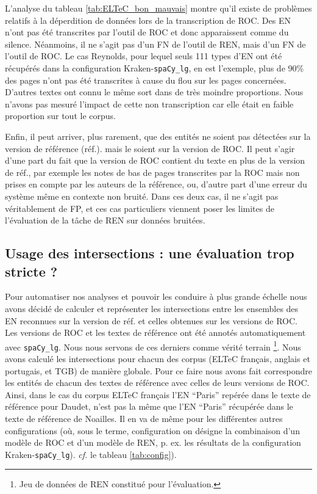 L'analyse du tableau \ref{tab:ELTeC_bon_mauvais} montre qu'il existe de problèmes relatifs à la déperdition de données lors de la transcription de ROC. Des EN n'ont pas été transcrites par l'outil de ROC et donc apparaissent comme du silence. Néanmoins, il ne s'agit pas d'un FN de l'outil de REN, mais d'un FN de l'outil de ROC. Le cas Reynolds, pour lequel seuls 111 types d'EN ont été récupérés dans la configuration Kraken-\texttt{spaCy\_lg}, en est l'exemple, plus de 90\% des pages n'ont pas été transcrites à cause du flou sur les pages concernées. D'autres textes ont connu le même sort dans de très moindre proportions. Nous n'avons pas mesuré l'impact de cette non transcription car elle était en faible proportion sur tout le corpus.


Enfin, il peut arriver, plus rarement, que des entités ne soient pas détectées sur la version de référence (réf.). mais le soient sur la version de ROC. Il peut s'agir d'une part du fait que la version de ROC contient du texte en plus de la version de réf., par exemple les notes de bas de pages transcrites par la ROC mais non prises en compte par les auteurs de la référence, ou, d'autre part  d’une erreur du système même en contexte non bruité. Dans ces deux cas, il ne s’agit pas véritablement de FP, et ces cas particuliers viennent poser les limites de l'évaluation de la tâche de REN sur données bruitées.


\subsection{Usage des intersections : une évaluation trop stricte ?}
\label{subsec:inter_OCR-IMPACT-NER}
Pour automatiser nos analyses et pouvoir les conduire à plus grande échelle nous avons décidé de calculer et représenter les intersections entre les ensembles des EN reconnues sur la version de réf. et celles obtenues sur les versions de ROC. Les versions de ROC et les textes de référence ont été annotés automatiquement avec \texttt{spaCy\_lg}. Nous nous servons de ces derniers comme vérité terrain \footnote{Jeu de données de REN constitué pour l'évaluation.}. Nous avons calculé les intersections pour chacun des corpus (ELTeC français, anglais et portugais, et TGB) de manière globale. 
Pour ce faire nous avons fait correspondre les entités de chacun des textes de référence avec celles de leurs versions de ROC. Ainsi, dans le cas du corpus ELTeC français l'EN ``Paris'' repérée dans le texte de référence pour Daudet, n'est pas la même que l'EN ``Paris'' récupérée dans le texte de référence de Noailles. Il en va de même pour les différentes autres configurations (où, sous le terme, \og{}configuration\fg{} on désigne la combinaison d'un modèle de ROC et d'un modèle de REN, p. ex. les résultats de la configuration Kraken-\texttt{spaCy\_lg}). \textit{cf.} le tableau \ref{tab:config}).

